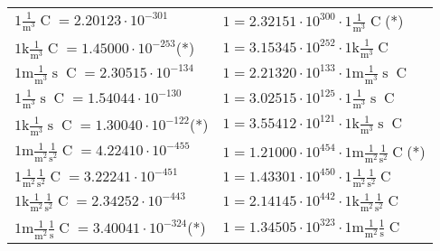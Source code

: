 \begin{center}
\begin{longtable}{l l}
{\color{black}$1 \bm{\mathrm{ }}\frac1{\operatorname{m}^3}{}{\operatorname{C}}{} = 2.20123\cdot10^{-301} $}   & {\color{black}$ 1 = 2.32151\cdot10^{300} \cdot 1 \bm{\mathrm{ }}\frac1{\operatorname{m}^3}{}{\operatorname{C}}{}$}\quad(*)\\
{\color{gray}$1 \bm{\mathrm{ k}}\frac1{\operatorname{m}^3}{}{\operatorname{C}}{} = 1.45000\cdot10^{-253} $}\quad(*) & {\color{gray}$ 1 = 3.15345\cdot10^{252} \cdot 1 \bm{\mathrm{ k}}\frac1{\operatorname{m}^3}{}{\operatorname{C}}{}$}  \\
{\color{gray}$1 \bm{\mathrm{ m}}\frac1{\operatorname{m}^3}{\operatorname{s}}{\operatorname{C}}{} = 2.30515\cdot10^{-134} $}   & {\color{gray}$ 1 = 2.21320\cdot10^{133} \cdot 1 \bm{\mathrm{ m}}\frac1{\operatorname{m}^3}{\operatorname{s}}{\operatorname{C}}{}$}  \\
{\color{black}$1 \bm{\mathrm{ }}\frac1{\operatorname{m}^3}{\operatorname{s}}{\operatorname{C}}{} = 1.54044\cdot10^{-130} $}   & {\color{black}$ 1 = 3.02515\cdot10^{125} \cdot 1 \bm{\mathrm{ }}\frac1{\operatorname{m}^3}{\operatorname{s}}{\operatorname{C}}{}$}  \\
{\color{gray}$1 \bm{\mathrm{ k}}\frac1{\operatorname{m}^3}{\operatorname{s}}{\operatorname{C}}{} = 1.30040\cdot10^{-122} $}\quad(*) & {\color{gray}$ 1 = 3.55412\cdot10^{121} \cdot 1 \bm{\mathrm{ k}}\frac1{\operatorname{m}^3}{\operatorname{s}}{\operatorname{C}}{}$}  \\
{\color{gray}$1 \bm{\mathrm{ m}}\frac1{\operatorname{m}^2}\frac1{\operatorname{s}^2}{\operatorname{C}}{} = 4.22410\cdot10^{-455} $}   & {\color{gray}$ 1 = 1.21000\cdot10^{454} \cdot 1 \bm{\mathrm{ m}}\frac1{\operatorname{m}^2}\frac1{\operatorname{s}^2}{\operatorname{C}}{}$}\quad(*)\\
{\color{black}$1 \bm{\mathrm{ }}\frac1{\operatorname{m}^2}\frac1{\operatorname{s}^2}{\operatorname{C}}{} = 3.22241\cdot10^{-451} $}   & {\color{black}$ 1 = 1.43301\cdot10^{450} \cdot 1 \bm{\mathrm{ }}\frac1{\operatorname{m}^2}\frac1{\operatorname{s}^2}{\operatorname{C}}{}$}  \\
{\color{gray}$1 \bm{\mathrm{ k}}\frac1{\operatorname{m}^2}\frac1{\operatorname{s}^2}{\operatorname{C}}{} = 2.34252\cdot10^{-443} $}   & {\color{gray}$ 1 = 2.14145\cdot10^{442} \cdot 1 \bm{\mathrm{ k}}\frac1{\operatorname{m}^2}\frac1{\operatorname{s}^2}{\operatorname{C}}{}$}  \\
{\color{gray}$1 \bm{\mathrm{ m}}\frac1{\operatorname{m}^2}\frac1{\operatorname{s}}{\operatorname{C}}{} = 3.40041\cdot10^{-324} $}\quad(*) & {\color{gray}$ 1 = 1.34505\cdot10^{323} \cdot 1 \bm{\mathrm{ m}}\frac1{\operatorname{m}^2}\frac1{\operatorname{s}}{\operatorname{C}}{}$}  \\

\end{longtable}
\end{center}
